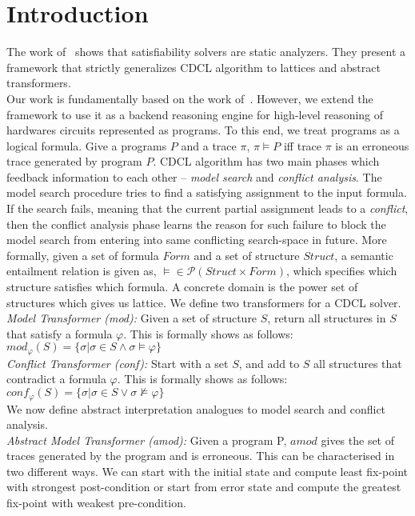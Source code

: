 \section{Introduction}
%
The work of~\cite{dhk2013-popl,sas12,tacas12} 
shows that satisfiability solvers are static analyzers. They present 
a framework that strictly generalizes CDCL algorithm to lattices and 
abstract transformers. \\
Our work is fundamentally based on the work of~\cite{dhk2013-popl}. 
However, we extend the framework to use it as a backend reasoning 
engine for high-level reasoning of hardwares circuits represented as programs.
To this end, we treat programs as a logical formula. Give a programs $P$ and a trace $\pi$,
$\pi \models P$ iff trace $\pi$ is an erroneous trace generated by program
$P$. CDCL algorithm has two main phases which feedback information to each other --
{\em model search} and {\em conflict analysis}. The model search procedure tries to find a 
satisfying assignment to the input formula. If the search fails, meaning that the current 
partial assignment leads to a {\em conflict}, then the conflict analysis phase learns the 
reason for such failure to block the model search from entering into same conflicting 
search-space in future. More formally, given a set of formula $Form$ and a set of 
structure $Struct$, a semantic entailment relation is given as, $\models \in \mathcal{P}(Struct
\times Form)$, which specifies which structure satisfies which formula. A 
concrete domain is the power set of structures which gives us lattice. 
We define two transformers for a CDCL solver. \\
\textit{Model Transformer (mod):} Given a set of structure $S$, return all structures 
in $S$ that satisfy a formula $\varphi$. This is formally shows as follows:
$mod_{\varphi}(S) = \{\sigma | \sigma \in S \wedge \sigma \models \varphi\}$ \\

\textit{Conflict Transformer (conf):} Start with a set $S$, and add to $S$ all structures 
that contradict a formula $\varphi$. This is formally shows as follows:
$conf_{\varphi}(S) = \{\sigma | \sigma \in S \vee \sigma \not\models \varphi\}$
\\
We now define abstract interpretation analogues to model search and conflict analysis.   \\
\textit{Abstract Model Transformer (amod):} Given a program P, $amod$ gives the 
set of traces generated by the program and is erroneous. This can be
characterised in two different ways. We can start with the initial state and
compute least fix-point with strongest post-condition or start from error state 
and compute the greatest fix-point with weakest pre-condition. \\

